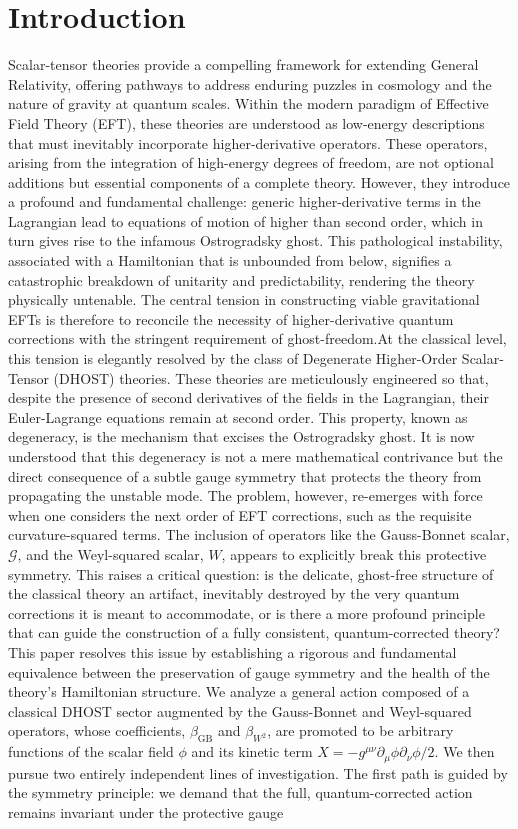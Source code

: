 \documentclass[twocolumn]{aastex631}
\begin{document}
\section{Introduction}
\label{sec:intro}
Scalar-tensor theories provide a compelling framework for extending General Relativity, offering pathways to address enduring puzzles in cosmology and the nature of gravity at quantum scales. Within the modern paradigm of Effective Field Theory (EFT), these theories are understood as low-energy descriptions that must inevitably incorporate higher-derivative operators. These operators, arising from the integration of high-energy degrees of freedom, are not optional additions but essential components of a complete theory. However, they introduce a profound and fundamental challenge: generic higher-derivative terms in the Lagrangian lead to equations of motion of higher than second order, which in turn gives rise to the infamous Ostrogradsky ghost. This pathological instability, associated with a Hamiltonian that is unbounded from below, signifies a catastrophic breakdown of unitarity and predictability, rendering the theory physically untenable. The central tension in constructing viable gravitational EFTs is therefore to reconcile the necessity of higher-derivative quantum corrections with the stringent requirement of ghost-freedom.At the classical level, this tension is elegantly resolved by the class of Degenerate Higher-Order Scalar-Tensor (DHOST) theories. These theories are meticulously engineered so that, despite the presence of second derivatives of the fields in the Lagrangian, their Euler-Lagrange equations remain at second order. This property, known as degeneracy, is the mechanism that excises the Ostrogradsky ghost. It is now understood that this degeneracy is not a mere mathematical contrivance but the direct consequence of a subtle gauge symmetry that protects the theory from propagating the unstable mode. The problem, however, re-emerges with force when one considers the next order of EFT corrections, such as the requisite curvature-squared terms. The inclusion of operators like the Gauss-Bonnet scalar, $\mathcal{G}$, and the Weyl-squared scalar, $W$, appears to explicitly break this protective symmetry. This raises a critical question: is the delicate, ghost-free structure of the classical theory an artifact, inevitably destroyed by the very quantum corrections it is meant to accommodate, or is there a more profound principle that can guide the construction of a fully consistent, quantum-corrected theory?This paper resolves this issue by establishing a rigorous and fundamental equivalence between the preservation of gauge symmetry and the health of the theory's Hamiltonian structure. We analyze a general action composed of a classical DHOST sector augmented by the Gauss-Bonnet and Weyl-squared operators, whose coefficients, $\beta_{\text{GB}}$ and $\beta_{W^2}$, are promoted to be arbitrary functions of the scalar field $\phi$ and its kinetic term $X = -g^{\mu\nu}\partial_\mu\phi\partial_\nu\phi/2$. We then pursue two entirely independent lines of investigation. The first path is guided by the symmetry principle: we demand that the full, quantum-corrected action remains invariant under the protective gauge 
\end{document}
